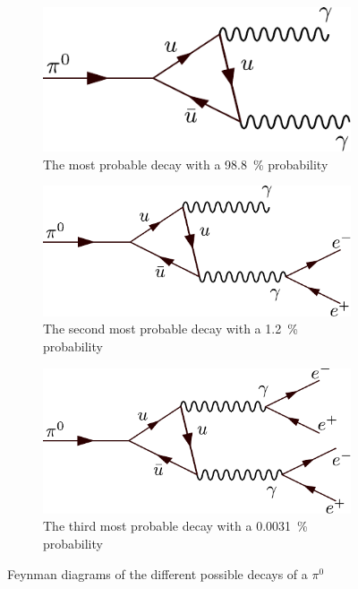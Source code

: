 \begin{figure}[H]
	\centering
	\begin{subfigure}[t]{0.45\textwidth}
		\includegraphics[width=\textwidth]{figures/feynman_a.pdf}
		\caption{The most probable decay with a \SI{98.8}{\percent} probability}
	\end{subfigure}
	\hfill
	\begin{subfigure}[t]{0.45\textwidth}
		\includegraphics[width=\textwidth]{figures/feynman_b.pdf}
		\caption{The second most probable decay with a \SI{1.2}{\percent} probability}
	\end{subfigure}
	\hfill
	\begin{subfigure}[t]{0.45\textwidth}
		\includegraphics[width=\textwidth]{figures/feynman_c.pdf}
		\caption{The third most probable decay with a \SI{0.0031}{\percent} probability}
	\end{subfigure}
	\caption{Feynman diagrams of the different possible decays of a $\pi^0$}
\end{figure}

